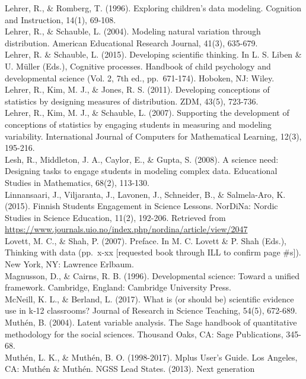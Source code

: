 \documentclass[]{msu-thesis}
\theoremstyle{definition}
\theoremstyle{definition}
\theoremstyle{definition}
\theoremstyle{remark}
\begin{document}
Lehrer, R., \& Romberg, T. (1996). Exploring children's data modeling.
Cognition and Instruction, 14(1), 69-108.\\
Lehrer, R., \& Schauble, L. (2004). Modeling natural variation through
distribution. American Educational Research Journal, 41(3), 635-679.\\
Lehrer, R. \& Schauble, L. (2015). Developing scientific thinking. In L.
S. Liben \& U. Müller (Eds.), Cognitive processes. Handbook of child
psychology and developmental science (Vol. 2, 7th ed., pp.~671-174).
Hoboken, NJ: Wiley.\\
Lehrer, R., Kim, M. J., \& Jones, R. S. (2011). Developing conceptions
of statistics by designing measures of distribution. ZDM, 43(5),
723-736.\\
Lehrer, R., Kim, M. J., \& Schauble, L. (2007). Supporting the
development of conceptions of statistics by engaging students in
measuring and modeling variability. International Journal of Computers
for Mathematical Learning, 12(3), 195-216.\\
Lesh, R., Middleton, J. A., Caylor, E., \& Gupta, S. (2008). A science
need: Designing tasks to engage students in modeling complex data.
Educational Studies in Mathematics, 68(2), 113-130.\\
Linnansaari, J., Viljaranta, J., Lavonen, J., Schneider, B., \&
Salmela-Aro, K. (2015). Finnish Students Engagement in Science Lessons.
NorDiNa: Nordic Studies in Science Education, 11(2), 192-206. Retrieved
from
\url{https://www.journals.uio.no/index.php/nordina/article/view/2047}\\
Lovett, M. C., \& Shah, P. (2007). Preface. In M. C. Lovett \& P. Shah
(Eds.), Thinking with data (pp.~x-xx {[}requested book through ILL to
confirm page \#s{]}). New York, NY: Lawrence Erlbaum.\\
Magnusson, D., \& Cairns, R. B. (1996). Developmental science: Toward a
unified framework. Cambridge, England: Cambridge University Press.\\
McNeill, K. L., \& Berland, L. (2017). What is (or should be) scientific
evidence use in k‐12 classrooms? Journal of Research in Science
Teaching, 54(5), 672-689.\\
Muthén, B. (2004). Latent variable analysis. The Sage handbook of
quantitative methodology for the social sciences. Thousand Oaks, CA:
Sage Publications, 345-68.\\
Muthén, L. K., \& Muthén, B. O. (1998-2017). Mplus User's Guide. Los
Angeles, CA: Muthén \& Muthén. NGSS Lead States. (2013). Next generation
\end{document}
